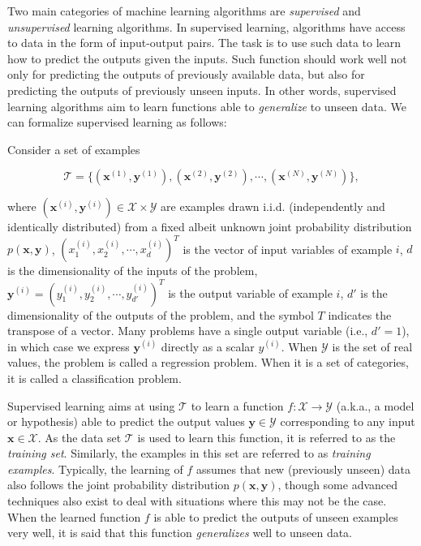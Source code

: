 Two main categories of machine learning algorithms are \textit{supervised} and \textit{unsupervised} learning algorithms. In supervised learning, algorithms have access to data in the form of input-output pairs. The task is to use such data to learn how to predict the outputs given the inputs. Such function should work well not only for predicting the outputs of previously available data, but also for predicting the outputs of previously unseen inputs. In other words, supervised learning algorithms aim to learn functions able to \textit{generalize} to unseen data. We can formalize supervised learning as follows:

Consider a set of examples 

\[\mathcal{T} = \{(\mathbf{x}^{(1)},\mathbf{y}^{(1)}),(\mathbf{x}^{(2)},\mathbf{y}^{(2)}),\cdots,(\mathbf{x}^{(N)},\mathbf{y}^{(N)})\},\]

\noindent where $(\mathbf{x}^{(i)},\mathbf{y}^{(i)}) \in \mathcal{X} \times \mathcal{Y}$  are examples drawn i.i.d. (independently and identically distributed) from a fixed albeit unknown joint probability distribution $p(\mathbf{x},\mathbf{y})$, $(x_1^{(i)},x_2^{(i)},\cdots,x_d^{(i)})^T$ is the vector of input variables of example $i$, $d$ is the dimensionality of the inputs of the problem, $\mathbf{y}^{(i)} = (y_1^{(i)}, y_2^{(i)}, \cdots, y_{d'}^{(i)})^T$ is the output variable of example $i$, $d'$ is the dimensionality of the outputs of the problem, and the symbol $T$ indicates the transpose of a vector. Many problems have a single output variable (i.e.,  $d'=1$), in which case we express $\mathbf{y}^{(i)}$ directly as a scalar $y^{(i)}$. When $\mathcal{Y}$ is the set of real values, the problem is called a regression problem. When it is a set of categories, it is called a classification problem. 

Supervised learning aims at using $\mathcal{T}$ to learn a function $f: \mathcal{X} \rightarrow \mathcal{Y}$ (a.k.a., a model or hypothesis) able to predict the output values $\mathbf{y} \in \mathcal{Y}$ corresponding to any input $\mathbf{x} \in \mathcal{X}$. As the data set $\mathcal{T}$ is used to learn this function, it is referred to as the \textit{training set}. Similarly, the examples in this set are referred to as \textit{training examples}. Typically, the learning of $f$ assumes that new (previously unseen) data also follows the joint probability distribution $p(\mathbf{x},\mathbf{y})$, though some advanced techniques also exist to deal with situations where this may not be the case. When the learned function $f$ is able to predict the outputs of unseen examples very well, it is said that this function \textit{generalizes} well to unseen data. 

